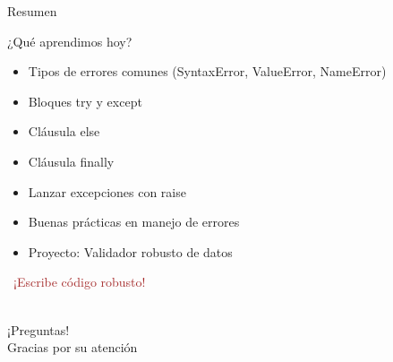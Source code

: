\documentclass{beamer}
\begin{document}
\begin{frame}{Resumen \faListUl}
\begin{conceptbox}{¿Qué aprendimos hoy?}
\small
\begin{itemize}
    \item[\faCheck] Tipos de errores comunes (SyntaxError, ValueError, NameError)
    \item[\faCheck] Bloques try y except
    \item[\faCheck] Cláusula else
    \item[\faCheck] Cláusula finally
    \item[\faCheck] Lanzar excepciones con raise
    \item[\faCheck] Buenas prácticas en manejo de errores
    \item[\faCheck] Proyecto: Validador robusto de datos
\end{itemize}
\end{conceptbox}

\vspace{0.3cm}
\begin{center}
\large\textcolor{brown}{\faShieldAlt\ ¡Escribe código robusto!}
\end{center}
\end{frame}

\begin{frame}
\begin{center}
\Huge\textcolor{brown}{\faQuestionCircle}\\
\vspace{0.5cm}
\Huge ¡Preguntas!\\
\vspace{1cm}
\Large\textcolor{brownbright}{Gracias por su atención}
\end{center}
\end{frame}
\end{document}
